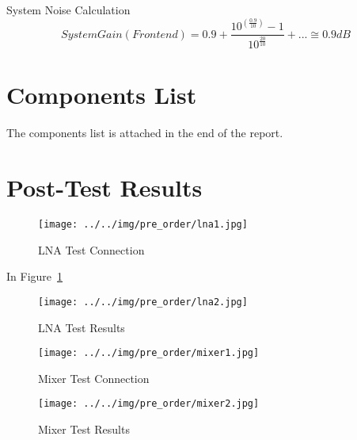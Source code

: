 \documentclass[]{article}
\begin{document}
    System Noise Calculation
    \begin{equation}
        System Gain (Front end) = 0.9 +
        \frac{10^(\frac{0.9}{10})-1}{10^\frac{20}{10}} + ... \cong 0.9dB
    \end{equation}

\section{Components List}
    The components list is attached in the end of the report.

\section{Post-Test Results}
    \begin{figure}[t!]
        \begin{center}
            \vspace{-0.3in}
            \texttt{[image: ../../img/pre\_order/lna1.jpg]}
            \label{fig:lna1}
            \caption{LNA Test Connection}
        \end{center}
    \end{figure}

    In Figure~\ref{fig:lna1}

    \begin{figure}[b!]
        \begin{center}
            \vspace{-0in}
            \texttt{[image: ../../img/pre\_order/lna2.jpg]}
            \label{fig:lna2}
            \caption{LNA Test Results}
        \end{center}
    \end{figure}

    \begin{figure}[t!]
        \begin{center}
            \vspace{-0.3in}
            \texttt{[image: ../../img/pre\_order/mixer1.jpg]}
            \label{fig:mixer1}
            \caption{Mixer Test Connection}
        \end{center}
    \end{figure}

    \begin{figure}[b!]
        \begin{center}
            \vspace{-0in}
            \texttt{[image: ../../img/pre\_order/mixer2.jpg]}
            \label{fig:mixer2}
            \caption{Mixer Test Results}
        \end{center}
    \end{figure}
\end{document}
